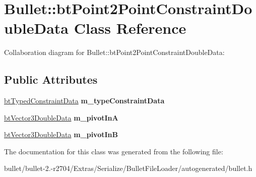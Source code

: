 \hypertarget{class_bullet_1_1bt_point2_point_constraint_double_data}{\section{Bullet\+:\+:bt\+Point2\+Point\+Constraint\+Double\+Data Class Reference}
\label{class_bullet_1_1bt_point2_point_constraint_double_data}
}


Collaboration diagram for Bullet\+:\+:bt\+Point2\+Point\+Constraint\+Double\+Data\+:
\subsection*{Public Attributes}
\begin{DoxyCompactItemize}
\item 
\hypertarget{class_bullet_1_1bt_point2_point_constraint_double_data_a8a915862ee67f18ae0af30dde1a3d654}{\hyperlink{class_bullet_1_1bt_typed_constraint_data}{bt\+Typed\+Constraint\+Data} {\bfseries m\+\_\+type\+Constraint\+Data}}\label{class_bullet_1_1bt_point2_point_constraint_double_data_a8a915862ee67f18ae0af30dde1a3d654}

\item 
\hypertarget{class_bullet_1_1bt_point2_point_constraint_double_data_a0c618bb001b0ed5623712e86e52e6939}{\hyperlink{class_bullet_1_1bt_vector3_double_data}{bt\+Vector3\+Double\+Data} {\bfseries m\+\_\+pivot\+In\+A}}\label{class_bullet_1_1bt_point2_point_constraint_double_data_a0c618bb001b0ed5623712e86e52e6939}

\item 
\hypertarget{class_bullet_1_1bt_point2_point_constraint_double_data_a7ce73c1c32fb8d7163a091c7e833c97c}{\hyperlink{class_bullet_1_1bt_vector3_double_data}{bt\+Vector3\+Double\+Data} {\bfseries m\+\_\+pivot\+In\+B}}\label{class_bullet_1_1bt_point2_point_constraint_double_data_a7ce73c1c32fb8d7163a091c7e833c97c}

\end{DoxyCompactItemize}


The documentation for this class was generated from the following file\+:\begin{DoxyCompactItemize}
\item 
bullet/bullet-\/2.-\/r2704/\+Extras/\+Serialize/\+Bullet\+File\+Loader/autogenerated/bullet.\+h\end{DoxyCompactItemize}
